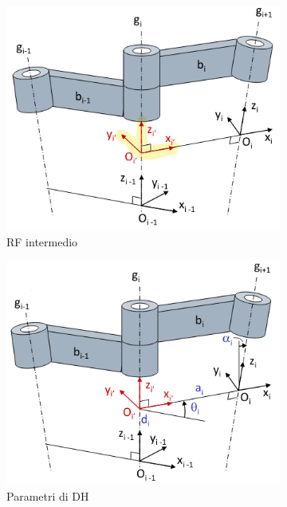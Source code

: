 \begin{figure}[H]
	\begin{subfigure}{0.5\linewidth}
		\centering
		\includegraphics[width=0.95\linewidth]{images/kinematics_8}
		\caption{RF intermedio}
		\label{fig:kinematics8}
	\end{subfigure}
	\hfill
	\begin{subfigure}{0.5\linewidth}
		\centering
		\includegraphics[width=0.95\linewidth]{images/kinematics_9}
		\caption{Parametri di DH}
		\label{fig:kinematics9}
	\end{subfigure}
	\caption{}
\end{figure}





